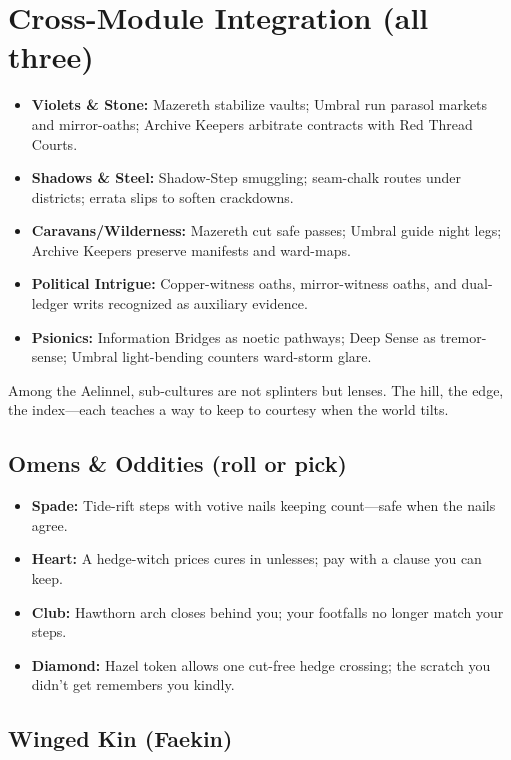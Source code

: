 \documentclass[11pt,letterpaper]{article}
\begin{document}
\section{Cross-Module Integration (all three)}
\begin{itemize}
\item \textbf{Violets \& Stone:} Mazereth stabilize vaults; Umbral run parasol markets and mirror-oaths; Archive Keepers arbitrate contracts with Red Thread Courts.
\item \textbf{Shadows \& Steel:} Shadow-Step smuggling; seam-chalk routes under districts; errata slips to soften crackdowns.
\item \textbf{Caravans/Wilderness:} Mazereth cut safe passes; Umbral guide night legs; Archive Keepers preserve manifests and ward-maps.
\item \textbf{Political Intrigue:} Copper-witness oaths, mirror-witness oaths, and dual-ledger writs recognized as auxiliary evidence.
\item \textbf{Psionics:} Information Bridges as noetic pathways; Deep Sense as tremor-sense; Umbral light-bending counters ward-storm glare.
\end{itemize}

Among the Aelinnel, sub-cultures are not splinters but lenses. The hill, the edge, the index---each teaches a way to keep to courtesy when the world tilts.

\subsection*{Omens \& Oddities (roll or pick)}
\begin{itemize}
\item \textbf{Spade:} Tide-rift steps with votive nails keeping count---safe when the nails agree.
\item \textbf{Heart:} A hedge-witch prices cures in unlesses; pay with a clause you can keep.
\item \textbf{Club:} Hawthorn arch closes behind you; your footfalls no longer match your steps.
\item \textbf{Diamond:} Hazel token allows one cut-free hedge crossing; the scratch you didn't get remembers you kindly.
\end{itemize}

\subsection*{Winged Kin (Faekin)}
\end{document}
